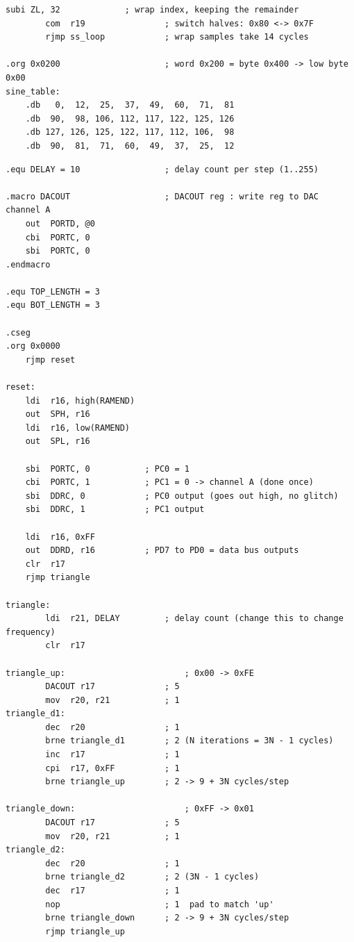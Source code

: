 \documentclass[11pt]{article}
\begin{document}
\begin{lstlisting}[language=avrasm,caption={Program 2. Table-based sine wave with a fixed or variable table step.},label={code:sine}]
        subi ZL, 32             ; wrap index, keeping the remainder
        com  r19                ; switch halves: 0x80 <-> 0x7F
        rjmp ss_loop            ; wrap samples take 14 cycles

.org 0x0200                     ; word 0x200 = byte 0x400 -> low byte 0x00
sine_table:
    .db   0,  12,  25,  37,  49,  60,  71,  81
    .db  90,  98, 106, 112, 117, 122, 125, 126
    .db 127, 126, 125, 122, 117, 112, 106,  98
    .db  90,  81,  71,  60,  49,  37,  25,  12
\end{lstlisting}

\begin{lstlisting}[language=avrasm,caption={Program 3. Triangle wave with variable frequency.},label={code:trivar}]
.equ DELAY = 10                 ; delay count per step (1..255)

.macro DACOUT                   ; DACOUT reg : write reg to DAC channel A
    out  PORTD, @0
    cbi  PORTC, 0
    sbi  PORTC, 0
.endmacro

.equ TOP_LENGTH = 3
.equ BOT_LENGTH = 3

.cseg
.org 0x0000
    rjmp reset

reset:
    ldi  r16, high(RAMEND)
    out  SPH, r16
    ldi  r16, low(RAMEND)
    out  SPL, r16

    sbi  PORTC, 0           ; PC0 = 1
    cbi  PORTC, 1           ; PC1 = 0 -> channel A (done once)
    sbi  DDRC, 0            ; PC0 output (goes out high, no glitch)
    sbi  DDRC, 1            ; PC1 output

    ldi  r16, 0xFF
    out  DDRD, r16          ; PD7 to PD0 = data bus outputs
    clr  r17
    rjmp triangle

triangle:
        ldi  r21, DELAY         ; delay count (change this to change frequency)
        clr  r17

triangle_up:                        ; 0x00 -> 0xFE
        DACOUT r17              ; 5
        mov  r20, r21           ; 1
triangle_d1:
        dec  r20                ; 1
        brne triangle_d1        ; 2 (N iterations = 3N - 1 cycles)
        inc  r17                ; 1
        cpi  r17, 0xFF          ; 1
        brne triangle_up        ; 2 -> 9 + 3N cycles/step

triangle_down:                      ; 0xFF -> 0x01
        DACOUT r17              ; 5
        mov  r20, r21           ; 1
triangle_d2:
        dec  r20                ; 1
        brne triangle_d2        ; 2 (3N - 1 cycles)
        dec  r17                ; 1
        nop                     ; 1  pad to match 'up'
        brne triangle_down      ; 2 -> 9 + 3N cycles/step
        rjmp triangle_up
\end{lstlisting}
\end{document}
